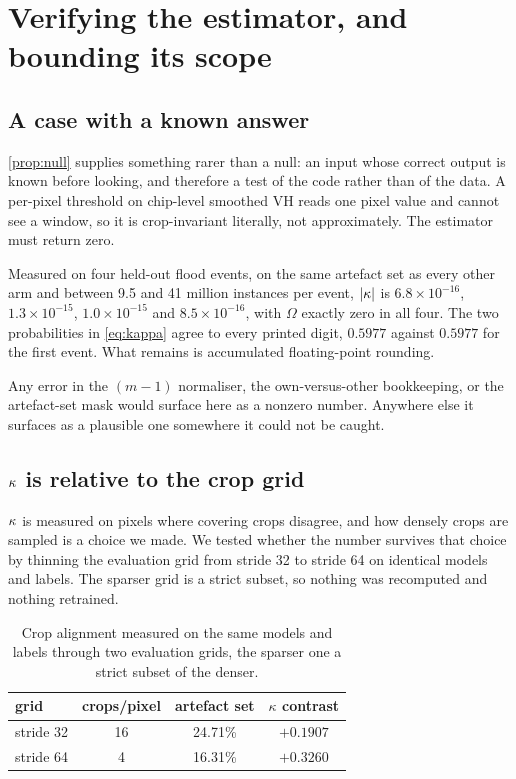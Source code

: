 \section{Verifying the estimator, and bounding its scope}
\label{sec:verify}

\subsection{A case with a known answer}

\cref{prop:null} supplies something rarer than a null: an input whose correct output
is known before looking, and therefore a test of the code rather than of the data. A
per-pixel threshold on chip-level smoothed VH reads one pixel value and cannot see a
window, so it is crop-invariant literally, not approximately. The estimator
must return zero.

Measured on four held-out flood events, on the same artefact set as every other arm
and between 9.5 and 41 million instances per event, $|\kappa|$ is
$6.8 \times 10^{-16}$, $1.3 \times 10^{-15}$, $1.0 \times 10^{-15}$ and
$8.5 \times 10^{-16}$, with $\Omega$ exactly zero in all four. The two probabilities
in \cref{eq:kappa} agree to every printed digit, $0.5977$ against $0.5977$ for the
first event. What remains is accumulated floating-point rounding.

Any error in the $(m-1)$ normaliser, the own-versus-other bookkeeping, or the
artefact-set mask would surface here as a nonzero number. Anywhere else it surfaces
as a plausible
one somewhere it could not be caught.

\subsection{$\kappa$ is relative to the crop grid}
\label{sec:grid}

$\kappa$ is measured on pixels where covering crops disagree, and how densely crops
are sampled is a choice we made. We tested whether the number survives that choice
by thinning the evaluation grid from stride 32 to stride 64 on identical models and
labels. The sparser grid is a strict subset, so nothing was recomputed and nothing
retrained.

\begin{table}[tb]
\centering
\small
\begin{tabular}{lccc}
\toprule
grid & crops/pixel & artefact set & $\kappa$ contrast \\
\midrule
stride 32 & 16 & 24.71\% & $+0.1907$ \\
stride 64 & 4  & 16.31\% & $+0.3260$ \\
\bottomrule
\end{tabular}
\caption{Crop alignment measured on the same models and labels through two
evaluation grids, the sparser one a strict subset of the denser.}
\label{tab:grid}
\end{table}

